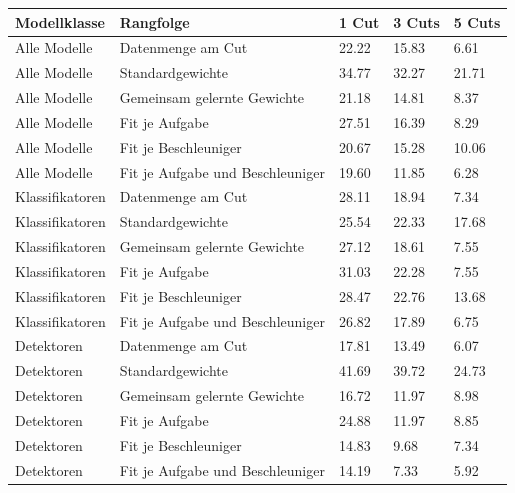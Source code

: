 \begin{tabular}{@{}lllll@{}}
\toprule
Modellklasse & Rangfolge & 1 Cut & 3 Cuts & 5 Cuts \\
\midrule
Alle Modelle & Datenmenge am Cut & 22.22 & 15.83 & 6.61 \\
Alle Modelle & Standardgewichte & 34.77 & 32.27 & 21.71 \\
Alle Modelle & Gemeinsam gelernte Gewichte & 21.18 & 14.81 & 8.37 \\
Alle Modelle & Fit je Aufgabe & 27.51 & 16.39 & 8.29 \\
Alle Modelle & Fit je Beschleuniger & 20.67 & 15.28 & 10.06 \\
Alle Modelle & Fit je Aufgabe und Beschleuniger & 19.60 & 11.85 & 6.28 \\
Klassifikatoren & Datenmenge am Cut & 28.11 & 18.94 & 7.34 \\
Klassifikatoren & Standardgewichte & 25.54 & 22.33 & 17.68 \\
Klassifikatoren & Gemeinsam gelernte Gewichte & 27.12 & 18.61 & 7.55 \\
Klassifikatoren & Fit je Aufgabe & 31.03 & 22.28 & 7.55 \\
Klassifikatoren & Fit je Beschleuniger & 28.47 & 22.76 & 13.68 \\
Klassifikatoren & Fit je Aufgabe und Beschleuniger & 26.82 & 17.89 & 6.75 \\
Detektoren & Datenmenge am Cut & 17.81 & 13.49 & 6.07 \\
Detektoren & Standardgewichte & 41.69 & 39.72 & 24.73 \\
Detektoren & Gemeinsam gelernte Gewichte & 16.72 & 11.97 & 8.98 \\
Detektoren & Fit je Aufgabe & 24.88 & 11.97 & 8.85 \\
Detektoren & Fit je Beschleuniger & 14.83 & 9.68 & 7.34 \\
Detektoren & Fit je Aufgabe und Beschleuniger & 14.19 & 7.33 & 5.92 \\
\bottomrule
\end{tabular}
